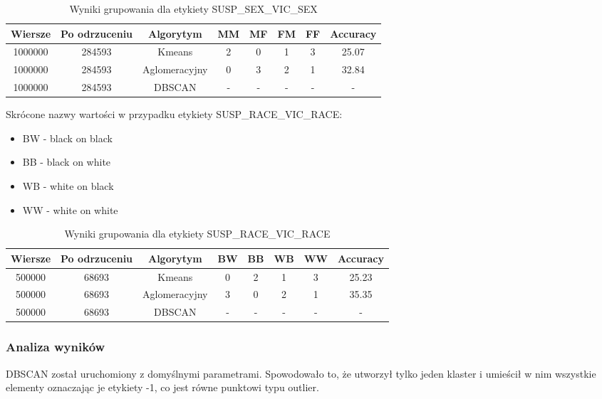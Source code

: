 \documentclass{classrep}
\begin{document}
{{            \begin{table}[!htbp]
                \begin{tabular}{|c|c|c|c|c|c|c|c|}
                    \hline
                    Wiersze & Po odrzuceniu & Algorytym & MM & MF & FM & FF & Accuracy \\ \hline
                    1000000 & 284593 & Kmeans & 2 & 0 & 1 & 3 & 25.07 \\ \hline
                    1000000 & 284593 & Aglomeracyjny & 0 & 3 & 2 & 1 & 32.84 \\ \hline
                    1000000 & 284593 & DBSCAN & - & - & - & - & - \\ \hline
                \end{tabular}
                \caption{Wyniki grupowania dla etykiety SUSP\_SEX\_VIC\_SEX}
                \label{tab:svsex}
            \end{table}

            Skrócone nazwy wartości w przypadku etykiety SUSP\_RACE\_VIC\_RACE:
            \begin{itemize}
                \item BW - black on black
                \item BB - black on white
                \item WB - white on black
                \item WW - white on white
            \end{itemize}

            \begin{table}[!htbp]
                \begin{tabular}{|c|c|c|c|c|c|c|c|}
                    \hline
                    Wiersze & Po odrzuceniu & Algorytym & BW & BB & WB & WW & Accuracy \\ \hline
                    500000 & 68693 & Kmeans & 0 & 2 & 1 & 3 & 25.23 \\ \hline
                    500000 & 68693 & Aglomeracyjny & 3 & 0 & 2 & 1 & 35.35 \\ \hline
                    500000 & 68693 & DBSCAN & - & - & - & - & - \\ \hline
                \end{tabular}
                \caption{Wyniki grupowania dla etykiety SUSP\_RACE\_VIC\_RACE}
                \label{tab:svsex}
            \end{table}

            \subsubsection{Analiza wyników}
            DBSCAN został uruchomiony z domyślnymi parametrami. Spowodowało to, że utworzył tylko jeden klaster i
            umieścił w nim wszystkie elementy oznaczając je etykiety -1, co jest równe punktowi typu outlier.

}}
\end{document}
